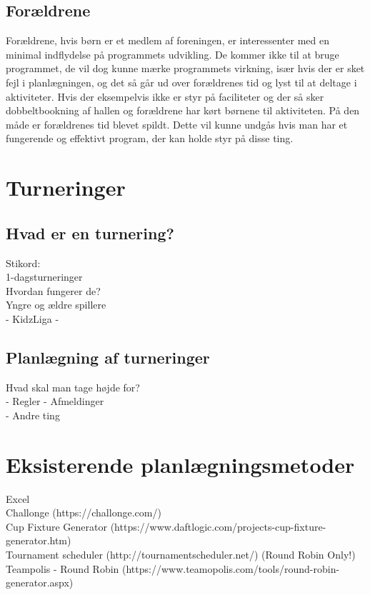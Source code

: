 
\subsection{Forældrene}
Forældrene, hvis børn er et medlem af foreningen, er interessenter med en minimal indflydelse på programmets udvikling. De kommer ikke til at bruge programmet, de vil dog kunne mærke programmets virkning, især hvis der er sket fejl i planlægningen, og det så går ud over forældrenes tid og lyst til at deltage i aktiviteter. Hvis der eksempelvis ikke er styr på faciliteter og der så sker dobbeltbookning af hallen og forældrene har kørt børnene til aktiviteten. På den måde er forældrenes tid blevet spildt. Dette vil kunne undgås hvis man har et fungerende og effektivt program, der kan holde styr på disse ting.
\\  

\section{Turneringer}
\subsection{Hvad er en turnering?}
 Stikord:\\
 1-dagsturneringer\\
 Hvordan fungerer de?\\
 Yngre og ældre spillere\\
  - KidzLiga
  - 
  
  
 
\subsection{Planlægning af turneringer}
Hvad skal man tage højde for?\\
 - Regler
 - Afmeldinger\\
 - Andre ting\\
 
 
\section{Eksisterende planlægningsmetoder}
Excel\\
Challonge (https://challonge.com/)\\
Cup Fixture Generator (https://www.daftlogic.com/projects-cup-fixture-generator.htm)\\ 
Tournament scheduler (http://tournamentscheduler.net/) (Round Robin Only!)\\
Teampolis - Round Robin (https://www.teamopolis.com/tools/round-robin-generator.aspx)\\



